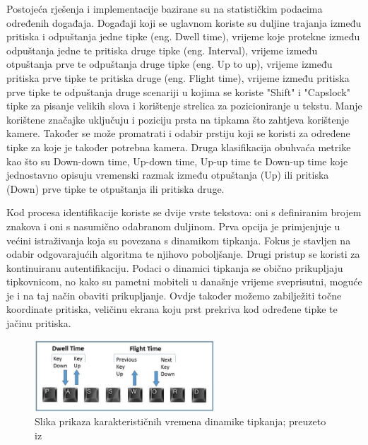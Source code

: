 \documentclass[]{foi}
\begin{document}
Postojeća rješenja i implementacije bazirane su na statističkim podacima određenih događaja. Događaji koji se uglavnom koriste su duljine trajanja između pritiska i odpuštanja jedne tipke (eng. Dwell time), vrijeme koje protekne između odpuštanja jedne te pritiska druge tipke (eng. Interval), vrijeme između otpuštanja prve te odpuštanja druge tipke (eng. Up to up), vrijeme između pritiska prve tipke te pritiska druge (eng. Flight time), vrijeme između pritiska prve tipke te odpuštanja druge scenariji u kojima se koriste "Shift" i "Capslock" tipke za pisanje velikih slova i korištenje strelica za pozicioniranje u tekstu.\cite{Kasprowski2022} Manje korištene značajke uključuju i poziciju prsta na tipkama što zahtjeva korištenje kamere. Također se može promatrati i odabir prstiju koji se koristi za određene tipke za koje je također potrebna kamera. Druga klasifikacija obuhvaća metrike kao što su Down-down time, Up-down time, Up-up time te Down-up time koje jednostavno opisuju vremenski razmak između otpuštanja (Up) ili pritiska (Down) prve tipke te otpuštanja ili pritiska druge.

Kod procesa identifikacije koriste se dvije vrste tekstova: oni s definiranim brojem znakova i oni s nasumično odabranom duljinom. Prva opcija je primjenjuje u većini istraživanja koja su povezana s dinamikom tipkanja. Fokus je stavljen na odabir odgovarajućih algoritma te njihovo poboljšanje. Drugi pristup se koristi za kontinuiranu autentifikaciju.\cite{Kasprowski2022} Podaci o dinamici tipkanja se obično prikupljaju tipkovnicom, no kako su pametni mobiteli u današnje vrijeme sveprisutni, moguće je i na taj način obaviti prikupljanje. Ovdje također možemo zabilježiti točne koordinate pritiska, veličinu ekrana koju prst prekriva kod određene tipke te jačinu pritiska.\cite{Lee2018}

\begin{figure}[!h]
    \centering
    \includegraphics[width=0.6\textwidth]{slike/karakteristike.jpeg}
    \caption{Slika prikaza karakterističnih vremena dinamike tipkanja; preuzeto iz \cite{Rootstrap}}
    \label{fig:slika-kar-vremena}
\end{figure}
\end{document}
